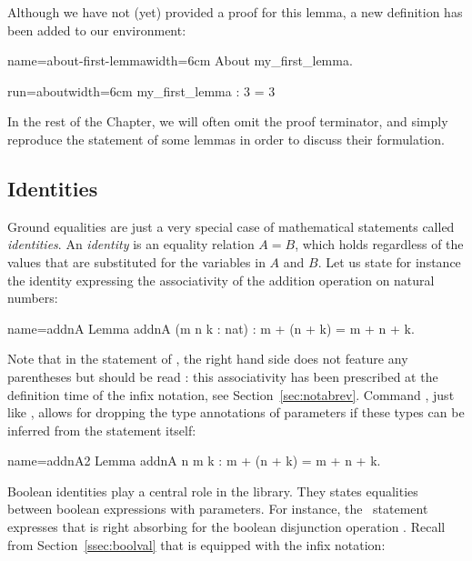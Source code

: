 Although we have not (yet) provided a proof for this lemma, a new
definition has been added to our environment:

\begin{coq}{name=about-first-lemma}{width=6cm}
About my_first_lemma.
\end{coq}
\begin{coqout}{run=about}{width=6cm}
my_first_lemma : 3 = 3
\end{coqout}

In the rest of the Chapter, we will often omit the  proof
terminator, and simply reproduce the statement of some lemmas in
order to discuss their formulation.

\subsection{Identities}\label{ssec:id}

Ground equalities are just a very special case of mathematical
statements called \emph{identities}. An \emph{identity} is an equality
relation $A = B$, which holds regardless of the values that are
substituted for the variables in $A$ and $B$.
Let us state for instance the identity expressing the associativity of
the addition operation on natural numbers:

\begin{coq}{name=addnA}{}
Lemma addnA (m n k : nat) : m + (n + k) = m + n + k.
\end{coq}

Note that in the statement of , the right hand side does not
feature any parentheses but should be read : this
associativity has been prescribed at the definition time of the infix
\C{+} notation, see Section~\ref{sec:notabrev}. Command
, just like , allows for
dropping the type annotations of parameters if these types can be
inferred from the statement itself:

\begin{coq}{name=addnA2}{}
Lemma addnA n m k : m + (n + k) = m + n + k.
\end{coq}

Boolean identities play a central role in the \mcbMC{} library. They
states equalities between boolean expressions with parameters. For
instance, the~ statement expresses that  is right absorbing
for the boolean disjunction operation . Recall from
Section~\ref{ssec:boolval} that  is equipped with the \C{||}
infix notation:

